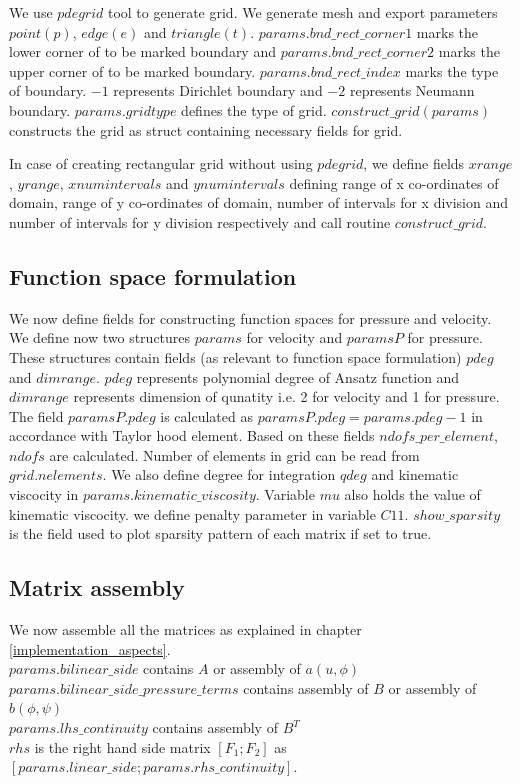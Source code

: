\documentclass[a4paper,12pt]{book}
\begin{document}
We use $pdegrid$ tool to generate grid. We generate mesh and export parameters $point(p)$, $edge(e)$ and $triangle(t)$. $params.bnd\_rect\_corner1$ marks the lower corner of to be marked boundary and $params.bnd\_rect\_corner2$ marks the upper corner of to be marked boundary. $params.bnd\_rect\_index$ marks the type of boundary. $-1$ represents Dirichlet boundary and $-2$ represents Neumann boundary. $params.gridtype$ defines the type of grid. $construct\_grid(params)$ constructs the grid as struct containing necessary fields for grid. 

In case of creating rectangular grid without using $pdegrid$, we define fields $xrange$, $yrange$, $xnumintervals$ and $ynumintervals$ defining range of x co-ordinates of domain, range of y co-ordinates of domain, number of intervals for x division and number of intervals for y division respectively and call routine $construct\_grid$.

\subsection{Function space formulation}

We now define fields for constructing function spaces for pressure and velocity. We define now two structures $params$ for velocity and $paramsP$ for pressure. These structures contain fields (as relevant to function space formulation) $pdeg$ and $dimrange$. $pdeg$ represents polynomial degree of Ansatz function and $dimrange$ represents  dimension of qunatity i.e. 2 for velocity and 1 for pressure. The field $paramsP.pdeg$ is calculated as $paramsP.pdeg = params.pdeg - 1$ in accordance with Taylor hood element. Based on these fields $ndofs\_per\_element$, $ndofs$ are calculated. Number of elements in grid can be read from $grid.nelements$. We also define degree for integration $qdeg$ and kinematic viscocity in $params.kinematic\_viscosity$. Variable $mu$ also holds the value of kinematic viscocity. we define penalty parameter in variable $C11$. $show\_sparsity$ is the field used to plot sparsity pattern of each matrix if set to true.\\

\subsection{Matrix assembly}

We now assemble all the matrices as explained in chapter \ref{implementation_aspects}. \\$params.bilinear\_side$ contains $A$ or assembly of $a(u,\phi)$\\$params.bilinear\_side\_pressure\_terms$ contains assembly of $B$ or assembly of $b(\phi,\psi)$\\ $params.lhs\_continuity$ contains assembly of $B^T$\\ $rhs$ is the right hand side matrix $[F_1;F_2]$ as\\ $[params.linear\_side;params.rhs\_continuity]$. \\
\end{document}
